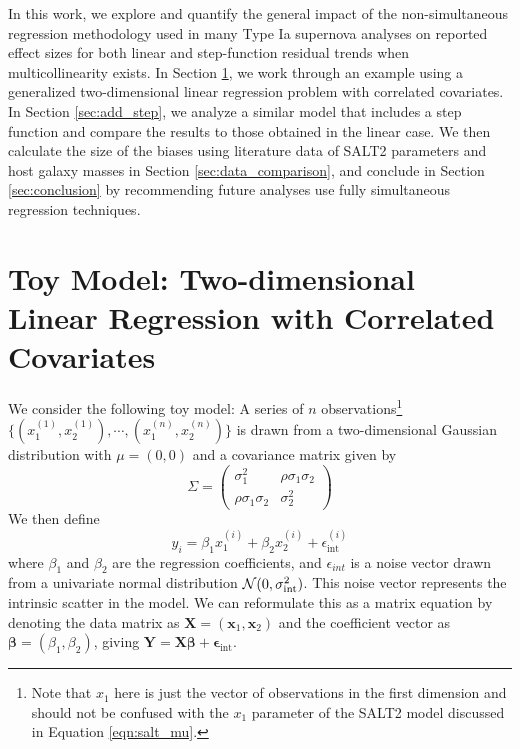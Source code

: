 In this work, we explore and quantify the general impact of the non-simultaneous regression methodology used in many Type Ia supernova analyses on reported effect sizes for both linear and step-function residual trends when multicollinearity exists. In Section \ref{sec:toy_model}, we work through an example using a generalized two-dimensional linear regression problem with correlated covariates. In Section \ref{sec:add_step}, we analyze a similar model that includes a step function and compare the results to those obtained in the linear case. We then calculate the size of the biases using literature data of SALT2 parameters and host galaxy masses in Section \ref{sec:data_comparison}, and conclude in Section \ref{sec:conclusion} by recommending future analyses use fully simultaneous regression techniques.

\section{Toy Model: Two-dimensional Linear Regression with Correlated Covariates} \label{sec:toy_model}
We consider the following toy model: A series of $n$ observations\footnote{Note that $x_1$ here is just the vector of observations in the first dimension and should not be confused with the $x_1$ parameter of the SALT2 model discussed  in Equation \ref{eqn:salt_mu}.} $\{(x_1^{(1)}, x_2^{(1)}), \cdots, (x_1^{(n)}, x_2^{(n)})\}$ is drawn from a two-dimensional Gaussian distribution with $\mu=(0, 0)$ and a covariance matrix given by
\begin{equation}
    \Sigma = \left(
    \begin{matrix}
        \sigma_1^2 & \rho\sigma_1\sigma_2\\
        \rho\sigma_1\sigma_2 & \sigma_2^2
    \end{matrix}
    \right)
\end{equation}
We then define
\begin{equation}
    y_i=\beta_1 x_1^{(i)} + \beta_2 x_2^{(i)} + \epsilon_{\text{int}}^{(i)}
\label{eqn:linear_model}
\end{equation}
where $\beta_1$ and $\beta_2$ are the regression coefficients, and $\epsilon_{int}$ is a noise vector drawn from a univariate normal distribution $\mathcal{N}(0, \sigma_{\text{int}}^2)$. This noise vector represents the intrinsic scatter in the model. We can reformulate this as a matrix equation by denoting the data matrix as $\bm{X} = (\bm{x}_1, \bm{x}_2)$ and the coefficient vector as $\bm{\beta}=(\beta_1, \beta_2)$, giving $\bm{Y}=\bm{X\beta}+\bm{\epsilon}_\text{int}$.

